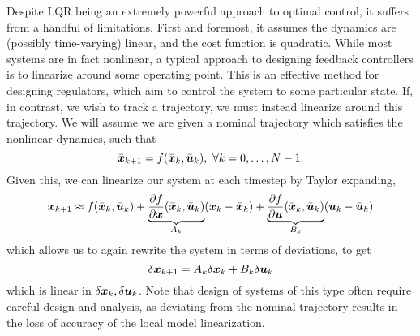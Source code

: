 Despite LQR being an extremely powerful approach to optimal control, it suffers from a handful of limitations. First and foremost, it assumes the dynamics are (possibly time-varying) linear, and the cost function is quadratic. While most systems are in fact nonlinear, a typical approach to designing feedback controllers is to linearize around some operating point. This is an effective method for designing regulators, which aim to control the system to some particular state. If, in contrast, we wish to track a trajectory, we must instead linearize around this trajectory. We will assume we are given a nominal trajectory which satisfies the nonlinear dynamics, such that
\begin{equation}
    \bar{\bm{x}}_{k+1} = f(\bar{\bm{x}}_k,\bar{\bm{u}}_k),\,\, \forall k = 0, \ldots, N-1. 
\end{equation}
Given this, we can linearize our system at each timestep by Taylor expanding,
\begin{equation}
    \bm{x}_{k+1} \approx f(\bar{\bm{x}}_k,\bar{\bm{u}}_k) + \underbrace{\frac{\partial f}{\partial \bm{x}} (\bar{\bm{x}}_k, \bar{\bm{u}}_k)}_{A_k} (\bm{x}_k - \bar{\bm{x}}_k) + \underbrace{\frac{\partial f}{\partial \bm{u}} (\bar{\bm{x}}_k, \bar{\bm{u}}_k)}_{B_k} (\bm{u}_k - \bar{\bm{u}}_k)
\end{equation}
which allows us to again rewrite the system in terms of deviations, to get
\begin{equation}
    \delta \bm{x}_{k+1} = A_k \delta \bm{x}_k + B_k \delta \bm{u}_k
\end{equation}
which is linear in $\delta \bm{x}_k, \delta \bm{u}_k$.  Note that design of systems of this type often require careful design and analysis, as deviating from the nominal trajectory results in the loss of accuracy of the local model linearization. 

